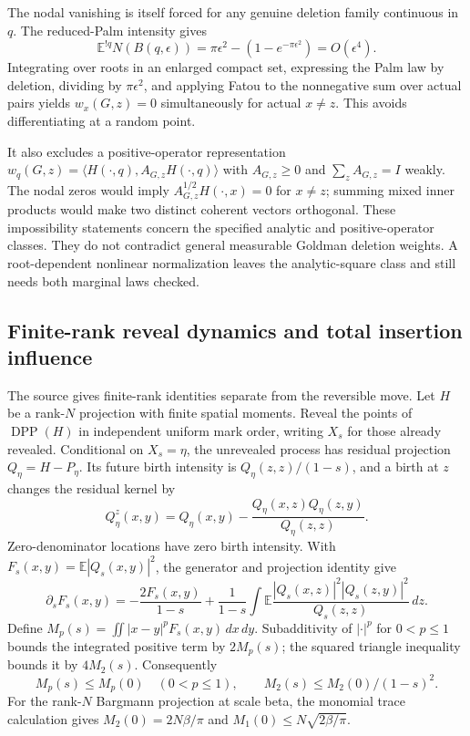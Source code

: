 \documentclass[11pt,a4paper]{article}
\theoremstyle{definition}
\theoremstyle{remark}
\numberwithin{equation}{section}
\begin{document}
The nodal vanishing is itself forced for any genuine deletion family
continuous in $q$. The reduced-Palm intensity gives
\[
 \mathbb E^{!q}N(B(q,\epsilon))
       =\pi\epsilon^2-(1-e^{-\pi\epsilon^2})=O(\epsilon^4).
\]
Integrating over roots in an enlarged compact set, expressing the
Palm law by deletion, dividing by $\pi\epsilon^2$, and applying
Fatou to the nonnegative sum over actual pairs yields
$w_x(G,z)=0$ simultaneously for actual $x\ne z$.
This avoids differentiating at a random point.

It also excludes a positive-operator representation
$w_q(G,z)=\langle H(\cdot,q),A_{G,z}H(\cdot,q)\rangle$
with $A_{G,z}\ge0$ and $\sum_zA_{G,z}=I$ weakly.
The nodal zeros would imply
$A_{G,z}^{1/2}H(\cdot,x)=0$ for $x\ne z$; summing mixed inner
products would make two distinct coherent vectors orthogonal.
These impossibility statements concern the specified analytic and
positive-operator classes. They do not contradict general measurable
Goldman deletion weights. A root-dependent nonlinear normalization
leaves the analytic-square class and still needs both marginal laws
checked.

\subsection{Finite-rank reveal dynamics and total insertion influence}
\label{br:residual-dynamics}

The source  gives finite-rank
identities separate from the reversible move. Let $H$ be a rank-$N$
projection with finite spatial moments. Reveal the points of
$\operatorname{DPP}(H)$ in independent uniform mark order, writing
$X_s$ for those already revealed. Conditional on $X_s=\eta$, the
unrevealed process has residual projection $Q_\eta=H-P_\eta$.
Its future birth intensity is $Q_\eta(z,z)/(1-s)$, and a birth at
$z$ changes the residual kernel by
\[
 Q_\eta^z(x,y)=Q_\eta(x,y)
       -\frac{Q_\eta(x,z)Q_\eta(z,y)}{Q_\eta(z,z)}.
\]
Zero-denominator locations have zero birth intensity.
With $F_s(x,y)=\mathbb E|Q_s(x,y)|^2$, the generator and projection
identity give
\[
 \partial_sF_s(x,y)=-\frac{2F_s(x,y)}{1-s}
 +\frac1{1-s}\int\mathbb E
       \frac{|Q_s(x,z)|^2|Q_s(z,y)|^2}{Q_s(z,z)}\,dz.
\]
Define $M_p(s)=\iint|x-y|^pF_s(x,y)\,dx\,dy$.
Subadditivity of $|\cdot|^p$ for $0<p\le1$ bounds the integrated
positive term by $2M_p(s)$; the squared triangle inequality bounds
it by $4M_2(s)$. Consequently
\begin{equation}\label{br:reveal-moments}
 M_p(s)\le M_p(0)\quad(0<p\le1),\qquad
 M_2(s)\le M_2(0)/(1-s)^2.
\end{equation}
For the rank-$N$ Bargmann projection at scale beta, the monomial
trace calculation gives $M_2(0)=2N\beta/\pi$ and
$M_1(0)\le N\sqrt{2\beta/\pi}$.
\end{document}
